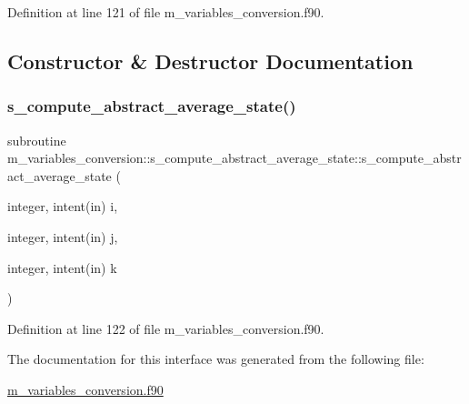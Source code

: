 Definition at line 121 of file m\+\_\+variables\+\_\+conversion.\+f90.



\subsection{Constructor \& Destructor Documentation}
\mbox{\label{interfacem__variables__conversion_1_1s__compute__abstract__average__state_a95df8743965c65a01070f21d3bb7acee}} 
\subsubsection{\texorpdfstring{s\+\_\+compute\+\_\+abstract\+\_\+average\+\_\+state()}{s\_compute\_abstract\_average\_state()}}
{\footnotesize\ttfamily subroutine m\+\_\+variables\+\_\+conversion\+::s\+\_\+compute\+\_\+abstract\+\_\+average\+\_\+state\+::s\+\_\+compute\+\_\+abstract\+\_\+average\+\_\+state (\begin{DoxyParamCaption}\item[{integer, intent(in)}]{i,  }\item[{integer, intent(in)}]{j,  }\item[{integer, intent(in)}]{k }\end{DoxyParamCaption})}



Definition at line 122 of file m\+\_\+variables\+\_\+conversion.\+f90.



The documentation for this interface was generated from the following file\+:\begin{DoxyCompactItemize}
\item 
\hyperlink{m__variables__conversion_8f90}{m\+\_\+variables\+\_\+conversion.\+f90}\end{DoxyCompactItemize}
